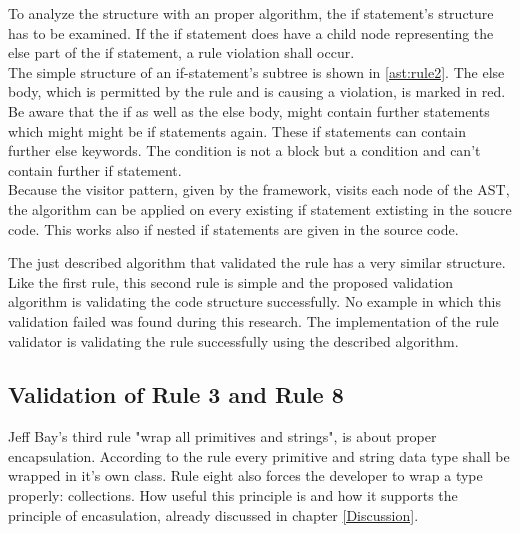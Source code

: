 To analyze the structure with an proper algorithm, the if statement's structure has to be examined. If the if statement does have a child node representing the else part of the if statement, a rule violation shall occur.
\\

The simple structure of an if-statement's subtree is shown in \ref{ast:rule2}. The else body, which is permitted by the rule and is causing a violation, is marked in red. 
Be aware that the if as well as the else body, might contain further statements which might might be if statements again. These if statements can contain further else keywords. The condition is not a block but a condition and can't contain further if statement.
\\

Because the visitor pattern, given by the framework, visits each node of the \acf{AST}, the algorithm can be applied on every existing if statement extisting in the soucre code. This works also if nested if statements are given in the source code.
\\

\label{ast:rule2}

The just described algorithm that validated the rule has a very similar structure. Like the first rule, this second rule is simple and the proposed validation algorithm is validating the code structure successfully. No example in which this validation failed was found during this research. The implementation of the rule validator is validating the rule successfully using the described algorithm.

\subsection*{Validation of Rule 3 and Rule 8}
Jeff Bay's third rule "wrap all primitives and strings", is about proper encapsulation. According to the rule every primitive and string data type shall be wrapped in it's own class. Rule eight also forces the developer to wrap a type properly: collections. How useful this principle is and how it supports the principle of encasulation, already discussed in chapter \ref{Discussion}.
\\

